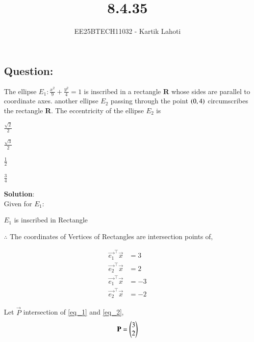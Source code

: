 \documentclass[journal]{IEEEtran}
\numberwithin{figure}{enumi}
\begin{document}

\vspace{3cm}

\title{8.4.35}
\author{EE25BTECH11032 - Kartik Lahoti}
\maketitle

\subsection*{Question: } 

The ellipse $E_1\colon\frac{x^2}{9}+\frac{y^2}{4} = 1$ is inscribed in a rectangle \textbf{R} whose sides are parallel to coordinate axes. another ellipse $E_2$ passing through the point $\left(0,4\right)$ circumscribes the rectangle \textbf{R}. The eccentricity of the ellipse $E_2$ is 

\begin{enumerate}
    \begin{multicols}{4}
    \item $\frac{\sqrt{2}}{2}$
    \item $\frac{\sqrt{3}}{2}$
    \item $\frac{1}{2}$
    \item $\frac{3}{4}$
    \end{multicols}
\end{enumerate}

\textbf{Solution}:\\

Given for $E_1\colon$

\begin{table}[H]
    \centering
    
    \caption*{}
    \label{tab:placeholder}
\end{table}

$E_1$ is inscribed in Rectangle

$\therefore$ The coordinates of Vertices of Rectangles are intersection points of, 

\begin{align}
    \vec{e_1}^{\top}\vec{x} &= 3 \label{eq_1} \\ 
    \vec{e_2}^{\top}\vec{x} &= 2 \label{eq_2} \\ 
    \vec{e_1}^{\top}\vec{x} &= -3\\
    \vec{e_2}^{\top}\vec{x} &= -2
\end{align}

Let $\vec{P}$ intersection of \ref{eq_1} and \ref{eq_2}, 
\begin{align}
    \mathbf{P} = \begin{pmatrix}3\\2\end{pmatrix}
\end{align}
\end{document}
